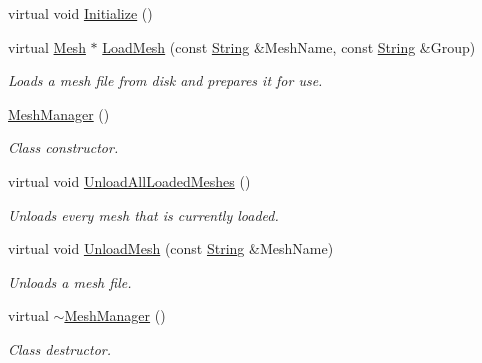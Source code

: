 \begin{DoxyCompactItemize}
\item 
virtual void \hyperlink{classMezzanine_1_1MeshManager_ac03c91bea88144bcfa420411bc85f0c7}{Initialize} ()
\item 
virtual \hyperlink{classMezzanine_1_1Mesh}{Mesh} $\ast$ \hyperlink{classMezzanine_1_1MeshManager_a01fcda6b9f1363e99b6ac61e4afcb951}{LoadMesh} (const \hyperlink{namespaceMezzanine_acf9fcc130e6ebf08e3d8491aebcf1c86}{String} \&MeshName, const \hyperlink{namespaceMezzanine_acf9fcc130e6ebf08e3d8491aebcf1c86}{String} \&Group)
\begin{DoxyCompactList}\small\item\em Loads a mesh file from disk and prepares it for use. \item\end{DoxyCompactList}\item 
\hypertarget{classMezzanine_1_1MeshManager_a6ef158bb2f5d96676df284ab1500f170}{
\hyperlink{classMezzanine_1_1MeshManager_a6ef158bb2f5d96676df284ab1500f170}{MeshManager} ()}
\label{classMezzanine_1_1MeshManager_a6ef158bb2f5d96676df284ab1500f170}

\begin{DoxyCompactList}\small\item\em Class constructor. \item\end{DoxyCompactList}\item 
\hypertarget{classMezzanine_1_1MeshManager_a95b66f15b74a8eb4f8cdfab411de6289}{
virtual void \hyperlink{classMezzanine_1_1MeshManager_a95b66f15b74a8eb4f8cdfab411de6289}{UnloadAllLoadedMeshes} ()}
\label{classMezzanine_1_1MeshManager_a95b66f15b74a8eb4f8cdfab411de6289}

\begin{DoxyCompactList}\small\item\em Unloads every mesh that is currently loaded. \item\end{DoxyCompactList}\item 
virtual void \hyperlink{classMezzanine_1_1MeshManager_aa8bf0e0aad71969dd4076cd36e2e8ab3}{UnloadMesh} (const \hyperlink{namespaceMezzanine_acf9fcc130e6ebf08e3d8491aebcf1c86}{String} \&MeshName)
\begin{DoxyCompactList}\small\item\em Unloads a mesh file. \item\end{DoxyCompactList}\item 
\hypertarget{classMezzanine_1_1MeshManager_a5022cb5a023a4ec75ca47ea722ecdad1}{
virtual \hyperlink{classMezzanine_1_1MeshManager_a5022cb5a023a4ec75ca47ea722ecdad1}{$\sim$MeshManager} ()}
\label{classMezzanine_1_1MeshManager_a5022cb5a023a4ec75ca47ea722ecdad1}

\begin{DoxyCompactList}\small\item\em Class destructor. \item\end{DoxyCompactList}\end{DoxyCompactItemize}

